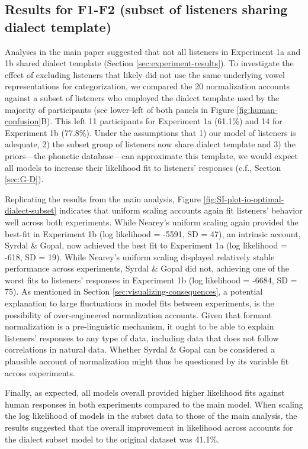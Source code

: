 \documentclass[preprint]{JASA}
\begin{document}
\subsection{Results for F1-F2 (subset of listeners sharing dialect template)}\label{sec:SI-dialect-subset}

Analyses in the main paper suggested that not all listeners in Experiment 1a and 1b shared dialect template (Section \ref{sec:experiment-results}). To investigate the effect of excluding listeners that likely did not use the same underlying vowel representations for categorization, we compared the 20 normalization accounts against a subset of listeners who employed the dialect template used by the majority of participants (see lower-left of both panels in Figure \ref{fig:human-confusion}B). This left 11 participants for Experiment 1a (61.1\%) and 14 for Experiment 1b (77.8\%). Under the assumptions that 1) our model of listeners is adequate, 2) the subset group of listeners now share dialect template and 3) the priors---the phonetic database---can approximate this template, we would expect all models to increase their likelihood fit to listeners' responses (c.f., Section \ref{sec:G-D}).

Replicating the results from the main analysis, Figure \ref{fig:SI-plot-io-optimal-dialect-subset} indicates that uniform scaling accounts again fit listeners' behavior well across both experiments. While Nearey's uniform scaling again provided the best-fit in Experiment 1b (log likelihood = -5591, SD = 47), an intrinsic account, Syrdal \& Gopal, now achieved the best fit to Experiment 1a (log likelihood = -618, SD = 19). While Nearey's uniform scaling displayed relatively stable performance across experiments, Syrdal \& Gopal did not, achieving one of the worst fits to listeners' responses in Experiment 1b (log likelihood = -6684, SD = 75). As mentioned in Section \ref{sec:visualizing-consequences}, a potential explanation to large fluctuations in model fits between experiments, is the possibility of over-engineered normalization accounts. Given that formant normalization is a pre-linguistic mechanism, it ought to be able to explain listeners' responses to any type of data, including data that does not follow correlations in natural data. Whether Syrdal \& Gopal can be considered a plausible account of normalization might thus be questioned by its variable fit across experiments.

Finally, as expected, all models overall provided higher likelihood fits against human responses in both experiments compared to the main model. When scaling the log likelihood of models in the subset data to those of the main analysis, the results suggested that the overall improvement in likelihood across accounts for the dialect subset model to the original dataset was 41.1\%.
\end{document}
